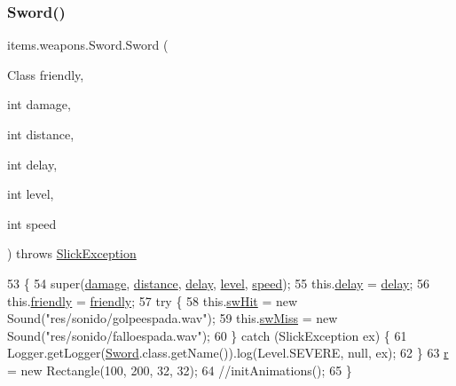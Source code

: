 \subsubsection{\texorpdfstring{Sword()}{Sword()}}
{\footnotesize\ttfamily items.\+weapons.\+Sword.\+Sword (\begin{DoxyParamCaption}\item[{Class}]{friendly,  }\item[{int}]{damage,  }\item[{int}]{distance,  }\item[{int}]{delay,  }\item[{int}]{level,  }\item[{int}]{speed }\end{DoxyParamCaption}) throws \mbox{\hyperlink{classorg_1_1newdawn_1_1slick_1_1_slick_exception}{Slick\+Exception}}\hspace{0.3cm}{\ttfamily [inline]}}


\begin{DoxyCode}
53                                                                                                            
             \{
54         super(\mbox{\hyperlink{classitems_1_1weapons_1_1_weapon_aa84d0aca66daedb3adb9209b6f2846a3}{damage}}, \mbox{\hyperlink{classitems_1_1weapons_1_1_weapon_a125dc77704bbb1758d35f282802dcb8d}{distance}}, \mbox{\hyperlink{classitems_1_1weapons_1_1_sword_a8d69cc681b95f364381987f28546f382}{delay}}, \mbox{\hyperlink{classitems_1_1weapons_1_1_weapon_ae66ceb47ad12380ee5d39960606980b3}{level}}, \mbox{\hyperlink{classitems_1_1weapons_1_1_weapon_ac653ddf600cd6add7078dc32b5f1584a}{speed}});
55         this.\mbox{\hyperlink{classitems_1_1weapons_1_1_sword_a8d69cc681b95f364381987f28546f382}{delay}} = \mbox{\hyperlink{classitems_1_1weapons_1_1_sword_a8d69cc681b95f364381987f28546f382}{delay}};
56         this.\mbox{\hyperlink{classitems_1_1weapons_1_1_sword_a63363009ee0969e2deb6d1f3af957d58}{friendly}} = \mbox{\hyperlink{classitems_1_1weapons_1_1_sword_a63363009ee0969e2deb6d1f3af957d58}{friendly}};
57         \textcolor{keywordflow}{try} \{
58             this.\mbox{\hyperlink{classitems_1_1weapons_1_1_sword_a83b89e36fa2e2f6f6d6aa6827657cbb5}{swHit}} = \textcolor{keyword}{new} Sound(\textcolor{stringliteral}{"res/sonido/golpeespada.wav"});
59             this.\mbox{\hyperlink{classitems_1_1weapons_1_1_sword_a33baf7fba31bad5610a1ce68142debf9}{swMiss}} = \textcolor{keyword}{new} Sound(\textcolor{stringliteral}{"res/sonido/falloespada.wav"});
60         \} \textcolor{keywordflow}{catch} (SlickException ex) \{
61             Logger.getLogger(\mbox{\hyperlink{classitems_1_1weapons_1_1_sword_a858d8a5d8fb4356c393ddd8dd726d375}{Sword}}.class.getName()).log(Level.SEVERE, null, ex);
62         \}
63         \mbox{\hyperlink{classitems_1_1weapons_1_1_sword_a0e6a4807a1682dc6790d287b01077da9}{r}} = \textcolor{keyword}{new} Rectangle(100, 200, 32, 32);
64         \textcolor{comment}{//initAnimations();}
65     \}
\end{DoxyCode}


